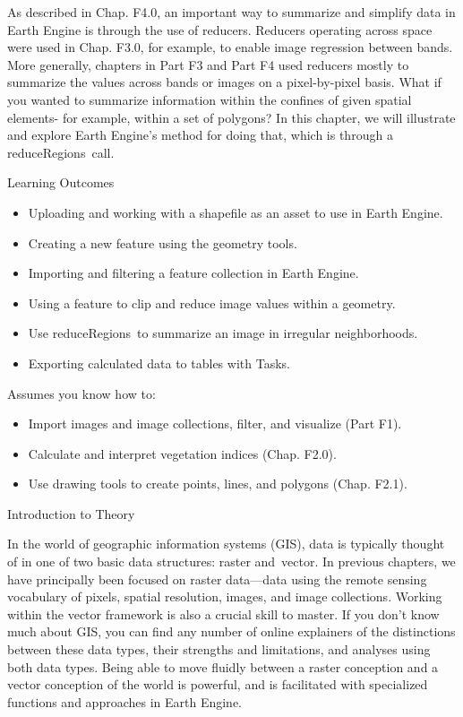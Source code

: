 \documentclass[
  letterpaper,
  DIV=11,
  numbers=noendperiod]{scrreprt}
\providecommand{\tightlist}{%
  \setlength{\itemsep}{0pt}\setlength{\parskip}{0pt}}\usepackage{longtable,booktabs,array}
\begin{document}
As described in Chap. F4.0, an important way to summarize and simplify
data in Earth Engine is through the use of reducers. Reducers operating
across space were used in Chap. F3.0, for example, to enable image
regression between bands. More generally, chapters in Part F3 and Part
F4 used reducers mostly to summarize the values across bands or images
on a pixel-by-pixel basis. What if you wanted to summarize information
within the confines of given spatial elements- for example, within a set
of polygons? In this chapter, we will illustrate and explore Earth
Engine's method for doing that, which is through a reduceRegions~call.

Learning Outcomes

\begin{itemize}
\tightlist
\item
  Uploading and working with a shapefile as an asset to use in Earth
  Engine.
\item
  Creating a new feature using the geometry tools.
\item
  Importing and filtering a feature collection in Earth Engine.
\item
  Using a feature to clip and reduce image values within a geometry.
\item
  Use reduceRegions~to summarize an image in irregular neighborhoods.
\item
  Exporting calculated data to tables with Tasks.
\end{itemize}

Assumes you know how to:

\begin{itemize}
\tightlist
\item
  Import images and image collections, filter, and visualize (Part F1).
\item
  Calculate and interpret vegetation indices (Chap. F2.0).
\item
  Use drawing tools to create points, lines, and polygons (Chap. F2.1).
\end{itemize}

Introduction to Theory~

In the world of geographic information systems (GIS), data is typically
thought of in one of two basic data structures: raster and~vector. In
previous chapters, we have principally been focused on raster
data---data using the remote sensing vocabulary of pixels, spatial
resolution, images, and image collections. Working within the vector
framework is also a crucial skill to master. If you don't know much
about GIS, you can find any number of online explainers of the
distinctions between these data types, their strengths and limitations,
and analyses using both data types. Being able to move fluidly between a
raster conception and a vector conception of the world is powerful, and
is facilitated with specialized functions and approaches in Earth
Engine. ~ ~
\end{document}
